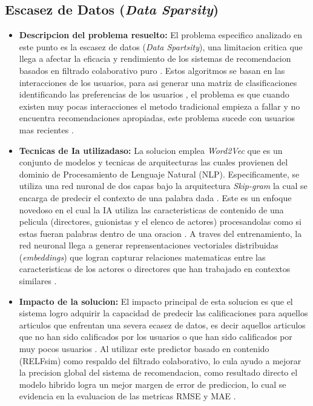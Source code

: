 \documentclass[12pt]{article}
\begin{document}
\subsection{Escasez de Datos (\textit{Data Sparsity})}
\begin{itemize}

	\item \textbf{Descripcion del problema resuelto:} El problema especifico analizado en este punto es la escasez de datos (\textit{Data Spartsity}), una limitacion critica que llega a afectar la eficacia y rendimiento de los sistemas de recomendacion basados en filtrado colaborativo puro \cite{DBLP:journals/corr/abs-2005-08148}. Estos algoritmos se basan en las interacciones de los usuarios, para asi generar una matriz de clasificaciones identificando las preferencias de los usuarios \cite{DBLP:journals/corr/abs-2005-08148}, el problema es que cuando existen muy pocas interacciones el metodo tradicional empieza a fallar y no encuentra recomendaciones apropiadas, este problema sucede con usuarios mas recientes \cite{DBLP:journals/corr/abs-2005-08148}.

	\item \textbf{Tecnicas de Ia utilizadaso:} La solucion emplea \textit{Word2Vec} que es un conjunto de modelos y tecnicas de arquitecturas las cuales provienen del dominio de Procesamiento de Lenguaje Natural (NLP). Especificamente, se utiliza una red nuronal de dos capas bajo la arquitectura \textit{Skip-gram} la cual se encarga de predecir el contexto de una palabra dada \cite{DBLP:journals/corr/abs-2005-08148}. Este es un enfoque novedoso  en el cual la IA utiliza las caracteristicas de contenido de una pelicula (directores, guionistas y el elenco de actores) procesandolas como si estas fueran palabras dentro de una oracion \cite{DBLP:journals/corr/abs-2005-08148}. A traves del entrenamiento, la red neuronal llega a generar reprensentaciones vectoriales distribuidas (\textit{embeddings}) que logran capturar relaciones matematicas entre las caracteristicas de los actores o directores que han trabajado en contextos similares \cite{DBLP:journals/corr/abs-2005-08148}.

	\item \textbf{Impacto de la solucion:} El impacto principal de esta solucion es que el sistema logro adquirir la capacidad de predecir las calificaciones para aquellos articulos que enfrentan una severa ecasez de datos, es decir aquellos articulos que no han sido calificados por los usuarios o que han sido calificados por muy pocos usuarios \cite{DBLP:journals/corr/abs-2005-08148}. Al utilizar este predictor basado en contenido (RELFsim) como respaldo del filtrado colaborativo, lo cula ayudo a mejorar la precision  global del sistema de recomendacion, como resultado directo el modelo hibrido logra un mejor margen de error de prediccion, lo cual se evidencia en la evaluacion de las metricas RMSE y MAE \cite{DBLP:journals/corr/abs-2005-08148}.


\end{itemize}
\end{document}
